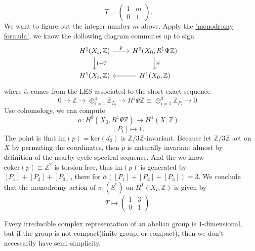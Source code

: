 \documentclass[../main.tex]{subfiles}
\begin{document}
\begin{example}
$$T=\begin{pmatrix}1 & m\\
0 & 1\end{pmatrix}.$$
We want to figure out the integer number $m$ above. Apply the \href{http://achinger.impan.pl/thesis.pdf}{'monodromy formula'}, we know the dollowing diagram commutes up to sign. 
$$\begin{tikzcd}
H^{1}(X_{t}, \mathbb{Z}) \arrow{r}{p}\arrow{d}{1-T} &H^{0}(X_{0}, R^{1}\Psi\mathbb{Z})\arrow{d}{\overline{\alpha}}\\
H^{1}(X_{t}, \mathbb{Z}) & H^{1}(X_{0}, \mathbb{Z})\arrow{l}
\end{tikzcd}$$
where $\overline{\alpha}$ comes from the LES associated to the short exact sequence 
$$0\rightarrow\mathbb{Z}\rightarrow  \oplus_{i=1}^{3}\mathbb{Z}_{L_{i}}\rightarrow R^{1}\Psi\mathbb{Z}\cong\oplus_{i=1}^{3}\mathbb{Z}_{P_{i}}\rightarrow 0.$$
Use \Cech cohomology, we can compute 
$$\overline{\alpha}: H^{0}(X_{0}, R^{1}\Psi\mathbb{Z})\rightarrow H^{1}(X, \mathbb{Z})$$
$$[P_{i}]\mapsto 1.$$ 
The point is that $\mathrm{im}(p)=\mathrm{ker}(d_{2})$ is $\mathbb{Z}/3\mathbb{Z}$-invariant. Because let $\mathbb{Z}/3\mathbb{Z}$ act on $X$ by permuting the coordinates, then $p$ is naturally invariant almost by definition of the nearby cycle spectral sequence. And the we know $\mathrm{coker}(p)\cong \mathbb{Z}^{2}$ is torsion free, thus $\mathrm{im}(p)$ is generated by $[P_{1}]+[P_{2}]+[P_{3}]$, there for $\overline{\alpha}([P_{1}]+[P_{2}]+[P_{3}])=3$. We conclude that the monodromy action of $\pi_{1}(S^{*})$ on $H^{1}(X_{t}, \mathbb{Z})$ is given by 
$$T\mapsto \begin{pmatrix}1 & 3\\0 & 1\end{pmatrix}.$$


\end{example}
\begin{remark}
Every irreducible complex representation of an abelian group is $1$-dimensional, but if the group is not compact(finite group, or compact), then we don't necessarily have semi-simplicity.
\end{remark}
\end{document}
